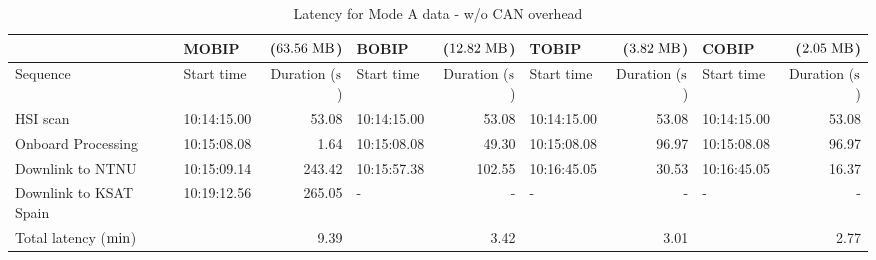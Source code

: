 \begin{table}[htbp]
	\caption{Latency for Mode A data - w/o CAN overhead}
	\label{tab:scenario-2c}
	\centering
	\begin{tabular}{l | l r |l  r|l r |l r}
	    \hline
         & MOBIP & ($63.56 \hspace{3pt} \rm{MB}$) & BOBIP  & ($12.82 \hspace{3pt} \rm{MB}$) & TOBIP & ($3.82 \hspace{3pt} \rm{MB}$) & COBIP & ($2.05 \hspace{3pt} \rm{MB}$) \\	
        \hline
        Sequence & Start time & Duration ($\rm{s}$) & Start time & Duration ($\rm{s}$) & Start time & Duration ($\rm{s}$) & Start time & Duration ($\rm{s}$) \\	
        \hline
    	HSI scan & 10:14:15.00 & 53.08 & 10:14:15.00 & 53.08 & 10:14:15.00 & 53.08 & 10:14:15.00 & 53.08 \\
    	Onboard Processing & 10:15:08.08 &  1.64 & 10:15:08.08 & 49.30 & 10:15:08.08 & 96.97 & 10:15:08.08 & 96.97  \\
        Downlink to NTNU & 10:15:09.14 &	243.42 & 10:15:57.38 & 102.55 & 10:16:45.05 &	30.53 & 10:16:45.05 & 16.37 \\
        Downlink to KSAT Spain & 10:19:12.56 &	265.05 & - &	- & - &	- & - & - \\
        \hline
        Total latency ($\rm{min}$) & & 9.39 & & 3.42 & & 3.01 & & 2.77 \\
        \hline
    \end{tabular}
\end{table}


